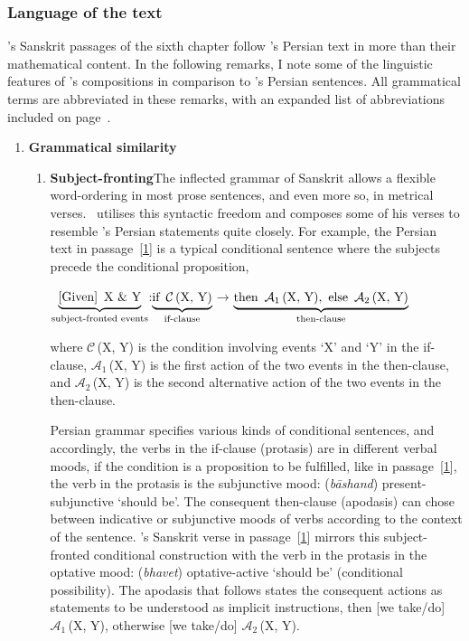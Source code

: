 \subsubsection{Language of the text} \label{language_content_zij_sindhu_chapter_six}
\Nityananda's Sanskrit passages of the sixth chapter follow \MullaFarid's  Persian text in more than their mathematical content. In the following remarks, I note some of the linguistic features of \Nityananda's compositions in comparison to \MullaFarid's Persian sentences. All grammatical terms are abbreviated in these remarks, with an expanded list of abbreviations included on page~\pageref{acronym}. 
\begin{enumerate}[topsep=0pt]
    \item \textbf{Grammatical similarity}
    \begin{enumerate}[topsep=0pt]
    \item  \label{subject_fronting_passage_1} \textbf{Subject-fronting}\quad  The inflected grammar of Sanskrit allows a flexible word-ordering in most prose sentences, and even more so, in metrical verses. \Nityananda\ utilises this syntactic freedom and composes some of his verses to resemble \MullaFarid's Persian statements quite closely. For example,
    the Persian text in passage~[\hyperlink{Ppass1}{1}] is a typical conditional sentence where the subjects precede the conditional proposition, \sic\ 
    {\par\centering
    $\underbrace{\text{[Given]\enskip X \& Y}}_{\text{subject-fronted events}}$\quad:\quad $\underbrace{\text{if\enskip $\mathcal{C}$\,(X, Y)}}_{\text{if-clause}}$\quad $\longrightarrow$\quad $\underbrace{\text{then\enskip $\mathcal{A}_\text{1}$\,(X, Y),\enskip else\enskip $\mathcal{A}_\text{2}$\,(X, Y)}}_{\text{then-clause}}$\par}    
    where $\mathcal{C}$\,(X, Y) is the condition involving events `X' and `Y' in the if-clause, $\mathcal{A}_\text{1}$\,(X, Y) is the first action of the two events in the then-clause, and $\mathcal{A}_\text{2}$\,(X, Y) is the second alternative action of the two events in the then-clause. 
    
    Persian grammar specifies various kinds of conditional sentences, and accordingly, the verbs in the if-clause (protasis) are in different verbal moods, \eg if the condition is a proposition to be fulfilled, like in passage~[\hyperlink{Ppass1}{1}], the verb in the protasis is the subjunctive mood:  (\textit{bāshand})  \acrshort{present}-\acrshort{subjunctive} `should be'. The consequent then-clause (apodasis) can chose between indicative or subjunctive moods of verbs according to the context of the sentence. \Nityananda's Sanskrit verse in passage~[\hyperlink{Spass1}{1}] mirrors this subject-fronted conditional construction with the verb in the protasis in the optative mood:  (\textit{bhavet}) \acrshort{optative}-\acrshort{active} `should be' (conditional possibility). The apodasis that follows states the consequent actions as statements to be understood as implicit instructions, \sic then [we take/do] $\mathcal{A}_\text{1}$\,(X, Y), otherwise [we take/do] $\mathcal{A}_\text{2}$\,(X, Y).
    

\end{enumerate}
\end{enumerate}
